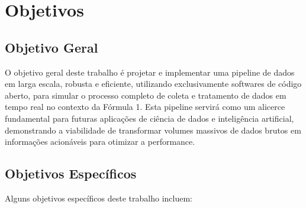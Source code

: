 \documentclass[12pt, %
openright, 
oneside, %
a4paper,    %
brazil]{facom-ufu-abntex2}
\begin{document}
\section{Objetivos}
\subsection{Objetivo Geral}

O objetivo geral deste trabalho é projetar e implementar uma pipeline de dados em larga 
escala, robusta e eficiente, utilizando exclusivamente softwares de código aberto, para
simular o processo completo de coleta e tratamento de dados em tempo real no contexto da 
Fórmula 1. Esta pipeline servirá como um alicerce fundamental para futuras aplicações de 
ciência de dados e inteligência artificial, demonstrando a viabilidade de transformar 
volumes massivos de dados brutos em informações acionáveis para otimizar a performance.

\subsection{Objetivos Específicos}

Alguns objetivos específicos deste trabalho incluem:
\end{document}
